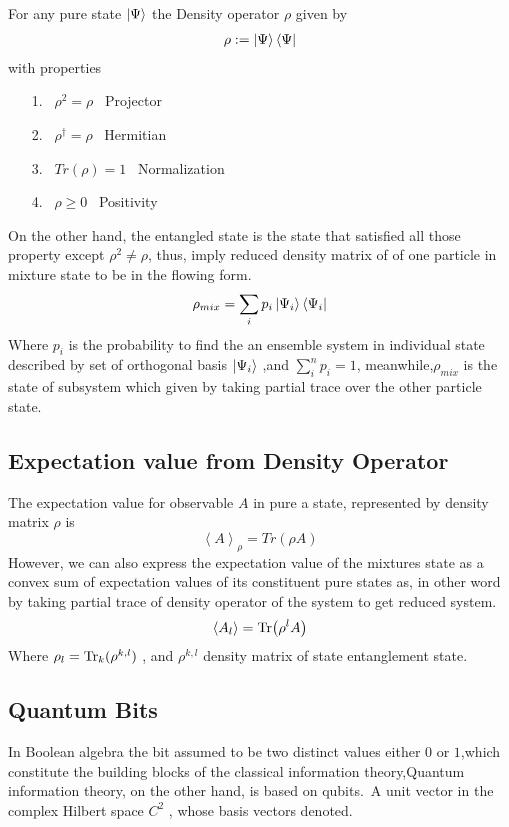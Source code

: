 For any pure state $\ket{\Psi}$ the Density operator $\rho$ given by
\begin{align}
\rho:=\ket{\Psi}\bra{\Psi}
\end{align}
with properties 
\begin{itemize}
\item[1.] ~$\rho^2=\rho$ ~Projector 
\item [2.]~$\rho^\dagger =\rho$ ~Hermitian
\item [3.]~$Tr(\rho)=1$ ~Normalization
\item [4.]~$\rho \geqslant 0$ ~Positivity
\end{itemize}
On the other hand, the entangled state is the state that satisfied all those property except $\rho^2\neq\rho$, thus, imply reduced  density matrix of of one particle in  mixture state to be in the flowing form.
\begin{equation}
\rho_{mix }= \sum_{i} p_i \ket{\Psi_i}\bra{\Psi_i}
\end{equation}
Where $p_i$ is the probability to find the an ensemble system in individual state described by set of orthogonal basis $\ket{\Psi_i} $ ,and $\sum_{i}^n p_i=1$, meanwhile,$\rho_{mix }$ is the state of subsystem which given by taking partial trace over the other particle state.

\subsection{Expectation value from Density Operator}

The expectation value for observable $A$ in pure a state, represented by density matrix $\rho$ is
$$\left<A\right>_\rho=Tr(\rho A)$$
However, we can also express the expectation value of the mixtures state as a convex sum of expectation values of its constituent pure states as, in other word by taking partial trace of density operator of the system to get reduced system. 
$$\left<A_l\right>= \Tr(\rho^l A)$$
Where $\rho_l=\Tr_k(\rho^{k,l})$ , and $\rho^{k,l}$ density matrix of state entanglement state.


\subsection{Quantum Bits}

In Boolean algebra the bit assumed to be two distinct values either $0 $ or $1$,which constitute the building blocks of the classical information theory,Quantum information theory, on the other hand, is based on qubits.\citep{nielsen2002quantum}~A unit vector in the complex Hilbert space $C^2$ , whose basis vectors denoted.

